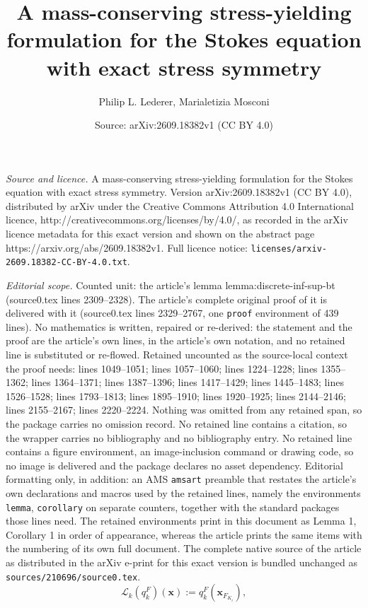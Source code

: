 \documentclass[10pt,a4paper]{amsart}
\title{A mass-conserving stress-yielding formulation for the Stokes equation with exact stress symmetry}
\author{Philip L. Lederer, Marialetizia Mosconi}
\date{Source: arXiv:2609.18382v1 (CC BY 4.0)}
\newcommand{\F}{F}
\newcommand{\Fi}{{\F_{\Ki}}}
\newcommand{\K}{K}
\newcommand{\Ki}{{\K_i}}
\newcommand{\Lcalk}{\mathcal{L}_k}
\newcommand{\qkF}{q^\F_{k}}
\newcommand{\xbf}{\mathbf{x}}
\begin{document}
\maketitle

\noindent\emph{Source and licence.} A mass-conserving stress-yielding formulation for the Stokes equation with exact stress symmetry. Version arXiv:2609.18382v1 (CC BY 4.0), distributed by arXiv under the Creative Commons Attribution 4.0 International licence, http://creativecommons.org/licenses/by/4.0/, as recorded in the arXiv licence metadata for this exact version and shown on the abstract page https://arxiv.org/abs/2609.18382v1. Full licence notice: \texttt{licenses/arxiv-2609.18382-CC-BY-4.0.txt}.\par\smallskip

\noindent\textit{Editorial scope.} Counted unit: the article's lemma lemma:discrete-inf-sup-bt (source0.tex lines 2309--2328). The article's complete original proof of it is delivered with it (source0.tex lines 2329--2767, one \texttt{proof} environment of 439 lines). No mathematics is written, repaired or re-derived: the statement and the proof are the article's own lines, in the article's own notation, and no retained line is substituted or re-flowed.  Retained uncounted as the source-local context the proof needs: lines 1049--1051; lines 1057--1060; lines 1224--1228; lines 1355--1362; lines 1364--1371; lines 1387--1396; lines 1417--1429; lines 1445--1483; lines 1526--1528; lines 1793--1813; lines 1895--1910; lines 1920--1925; lines 2144--2146; lines 2155--2167; lines 2220--2224.  Nothing was omitted from any retained span, so the package carries no omission record.  No retained line contains a citation, so the wrapper carries no bibliography and no bibliography entry.  No retained line contains a figure environment, an image-inclusion command or drawing code, so no image is delivered and the package declares no asset dependency.  Editorial formatting only, in addition: an AMS \texttt{amsart} preamble that restates the article's own declarations and macros used by the retained lines, namely the environments \texttt{lemma}, \texttt{corollary} on separate counters, together with the standard packages those lines need.  The retained environments print in this document as Lemma 1, Corollary 1 in order of appearance, whereas the article prints the same items with the numbering of its own full document.  The complete native source of the article as distributed in the arXiv e-print for this exact version is bundled unchanged as \texttt{sources/210696/source0.tex}.
\begin{equation} \label{Lcal}
\Lcalk(\qkF)(\xbf) := \qkF(\xbf_{\Fi}),
\end{equation}
\end{document}
